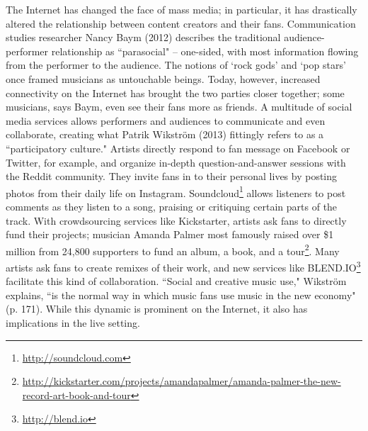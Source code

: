 The Internet has changed the face of mass media; in particular, it has drastically altered the relationship between content creators and their fans. Communication studies researcher Nancy Baym (2012) describes the traditional audience-performer relationship as ``parasocial" -- one-sided, with most information flowing from the performer to the audience. The notions of `rock gods' and `pop stars' once framed musicians as untouchable beings. Today, however, increased connectivity on the Internet has brought the two parties closer together; some musicians, says Baym, even see their fans more as friends. A multitude of social media services allows performers and audiences to communicate and even collaborate, creating what Patrik Wikstr\"{o}m (2013) fittingly refers to as a ``participatory culture." Artists directly respond to fan message on Facebook or Twitter, for example, and organize in-depth question-and-answer sessions with the Reddit community. They invite fans in to their personal lives by posting photos from their daily life on Instagram. Soundcloud\footnote{\url{http://soundcloud.com}} allows listeners to post comments as they listen to a song, praising or critiquing certain parts of the track. With crowdsourcing services like Kickstarter, artists ask fans to directly fund their projects; musician Amanda Palmer most famously raised over \$1 million from 24,800 supporters to fund an album, a book, and a tour\footnote{\url{http://kickstarter.com/projects/amandapalmer/amanda-palmer-the-new-record-art-book-and-tour}}. Many artists ask fans to create remixes of their work, and new services like BLEND.IO\footnote{\url{http://blend.io}} facilitate this kind of collaboration. ``Social and creative music use," Wikstr\"{o}m explains, ``is the normal way in which music fans use music in the new economy" (p. 171). While this dynamic is prominent on the Internet, it also has implications in the live setting.

